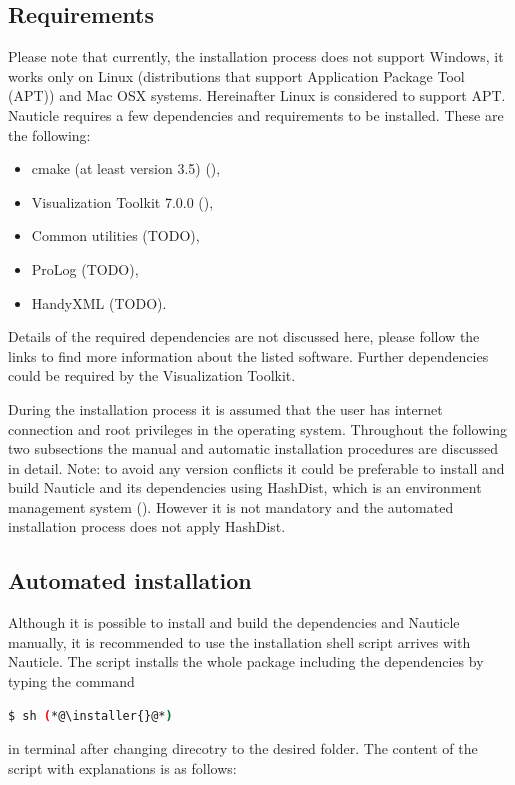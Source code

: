 \documentclass[a4paper,12pt,openany]{book}
\newcommand{\myhref}[3][nauticlegreen_dark]{\href{#2}{\color{#1}{#3}}}%
\theoremstyle{break}
\begin{document}
\subsection{Requirements}
Please note that currently, the installation process does not support Windows, it works only on Linux (distributions that support Application Package Tool (APT)) and Mac OSX systems.  Hereinafter Linux is considered to support APT.
Nauticle requires a few dependencies and requirements to be installed. These are the following:
\begin{itemize}
  \item cmake (at least version 3.5) (\myhref{https://cmake.org/download/}{https://cmake.org/download/}),
  \item Visualization Toolkit 7.0.0 (\myhref{http://www.vtk.org/files/release/7.0/VTK-7.0.0.zip}{http://www.vtk.org/files/release/7.0/VTK-7.0.0.zip}),
  \item Common utilities (TODO),
  \item ProLog (TODO),
  \item HandyXML (TODO).
\end{itemize} 
Details of the required dependencies are not discussed here, please follow the links to find more information about the listed software. Further dependencies could be required by the Visualization Toolkit.

During the installation process it is assumed that the user has internet connection and root privileges in the operating system. Throughout the following two subsections the manual and automatic installation procedures are discussed in detail.
Note: to avoid any version conflicts it could be preferable to install and build Nauticle and its dependencies using HashDist, which is an environment management system (\myhref{https://github.com/hashdist/hashdist}{https://github.com/hashdist/ hashdist}). However it is not mandatory and the automated installation process does not apply HashDist.
\subsection{Automated installation}
Although it is possible to install and build the dependencies and Nauticle manually, it is recommended to use the installation shell script arrives with Nauticle. The script installs the whole package including the dependencies by typing the command
\begin{lstlisting}[language=bash]
  $ sh (*@\installer{}@*)
\end{lstlisting}
in terminal after changing direcotry to the desired folder. The content of the script with explanations is as follows:
\end{document}
